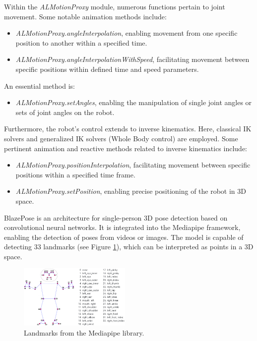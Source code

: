 \documentclass[conference]{IEEEtran}
\begin{document}
Within the \textit{ALMotionProxy} module, numerous functions pertain to joint movement. Some notable animation methods include:
\begin{itemize}
    \item \textit{ALMotionProxy.angleInterpolation}, enabling movement from one specific position to another within a specified time.
    \item \textit{ALMotionProxy.angleInterpolationWithSpeed}, facilitating movement between specific positions within defined time and speed parameters.
\end{itemize}
An essential method is:
\begin{itemize}
\item \textit{ALMotionProxy.setAngles}, enabling the manipulation of single joint angles or sets of joint angles on the robot.
\end{itemize}

Furthermore, the robot's control extends to inverse kinematics. Here, classical IK solvers and generalized IK solvers (Whole Body control) are employed. Some pertinent animation and reactive methods related to inverse kinematics include:
\begin{itemize}
    \item \textit{ALMotionProxy.positionInterpolation}, facilitating movement between specific positions within a specified time frame.
    \item \textit{ALMotionProxy.setPosition}, enabling precise positioning of the robot in 3D space.
\end{itemize}

BlazePose \cite{b2} is an architecture for single-person 3D pose detection based on convolutional neural networks. It is integrated into the Mediapipe framework, enabling the detection of poses from videos or images. The model is capable of detecting 33 landmarks (see Figure \ref{fig:landmarksMP}), which can be interpreted as points in a 3D space.

\begin{figure}[htbp]
\centerline{\includegraphics[width=0.48\textwidth]{images/landmarksMP.jpeg}}
\caption{Landmarks from the Mediapipe library.}
\label{fig:landmarksMP}
\end{figure}
\end{document}
